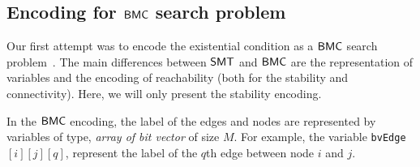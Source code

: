\subsection{Encoding for $\mathsf{BMC}$ search problem}
\label{enc:bmc}
\noindent Our first attempt was to encode the existential condition as a $\mathsf{BMC}$ search problem~\cite{shukla2017discovering}.
%
%
%
%
% 
The main differences between $\mathsf{SMT}$ and $\mathsf{BMC}$ are the representation of variables and the encoding of 
reachability (both for the stability and connectivity).  
Here, we will only present the stability encoding.

In the $\mathsf{BMC}$ encoding, the label of the edges and nodes are represented by variables of type, \textit{array of bit vector} of size $M$. 
%
For example, the variable \texttt{bvEdge}$[i][j][q]$, represent the label of the $q$th edge between node $i$ and $j$.

